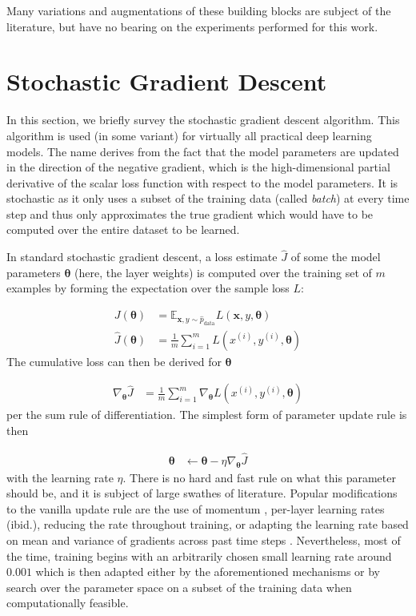 Many variations and augmentations of these building blocks are subject of the
literature, but have no bearing on the experiments performed for this work.

\section{Stochastic Gradient Descent}%
\label{sec:review_stochastic_gradient_descent}

In this section, we briefly survey the stochastic gradient descent algorithm.
This algorithm is used (in some variant) for virtually all practical deep
learning models. The name derives from the fact that the model parameters are
updated in the direction of the negative gradient, which is the high-dimensional
partial derivative of the scalar loss function with respect to the model
parameters. It is stochastic as it only uses a subset of the training data
(called \emph{batch}) at every time step and thus only approximates the true
gradient which would have to be computed over the entire dataset to be learned.

In standard stochastic gradient descent, a loss estimate $\widehat{J}$ of some the
model parameters $\boldsymbol\theta$ (here, the layer weights) is computed over the training set of $m$
examples by forming the expectation over the sample loss $L$:

\begin{align}
J(\boldsymbol\theta) &= \mathbb{E}_{\mathbf{x},y\sim\hat{p}_{\text{data}}} L(\mathbf{x}, y, \boldsymbol\theta) \\
\widehat{J}(\boldsymbol\theta)                         &= \frac{1}{m}\sum_{i=1}^{m}L(x^{(i)}, y^{(i)}, \boldsymbol\theta)
\end{align}
The cumulative loss can then be derived for $\boldsymbol\theta$

\begin{align}
\nabla_{\boldsymbol\theta}\widehat{J} &= \frac{1}{m}\sum_{i=1}^{m}\nabla_{\boldsymbol\theta}L(x^{(i)}, y^{(i)}, \boldsymbol\theta)
\end{align}
per the sum rule of differentiation. The simplest form of parameter update rule
is then

\begin{align}
    \boldsymbol\theta &\leftarrow \boldsymbol\theta - \eta
\nabla_{\boldsymbol\theta}\widehat{J}
\end{align}
with the learning rate $\eta$. There is no hard and fast rule on what this
parameter should be, and it is subject of large swathes of literature. Popular
modifications to the vanilla update rule are the use of momentum
\citep{jacobs1988increased}, per-layer learning rates (ibid.), reducing the rate
throughout training, or adapting the
learning rate based on mean and variance of gradients across past time steps
\citep{kingma2014adam}. Nevertheless, most of the time, training begins with an
arbitrarily chosen small learning rate around $0.001$ which is then adapted
either by the aforementioned mechanisms or by search over the parameter space on
a subset of the training data when computationally feasible.



